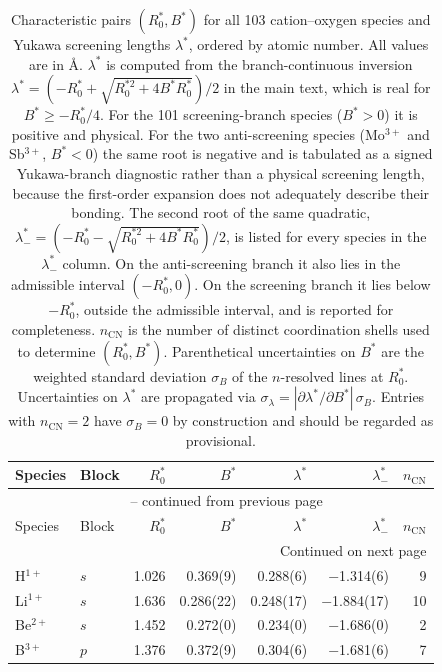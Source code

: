 \begin{longtable}{l l r r r r r}
\caption{Characteristic pairs $(R_0^*,B^*)$ for all 103 cation--oxygen
species and Yukawa screening lengths $\lambda^*$, ordered by atomic
number.  All values are in \AA.  $\lambda^*$ is computed from the
branch-continuous inversion
$\lambda^*=(-R_0^*+\sqrt{R_0^{*2}+4B^*R_0^*})/2$ in the main text,
which is real for $B^*\ge -R_0^*/4$.  For the 101 screening-branch
species ($B^*>0$) it is positive and physical.  For the two
anti-screening species (Mo$^{3+}$ and Sb$^{3+}$, $B^*<0$) the same
root is negative and is tabulated as a signed Yukawa-branch
diagnostic rather than a physical screening length, because the
first-order expansion does not adequately describe their bonding.
The second root of the same quadratic,
$\lambda^*_-=(-R_0^*-\sqrt{R_0^{*2}+4B^*R_0^*})/2$, is listed for
every species in the $\lambda^*_-$ column.  On the anti-screening
branch it also lies in the admissible interval $(-R_0^*,0)$.  On
the screening branch it lies below $-R_0^*$, outside the
admissible interval, and is reported for completeness.
$n_{\mathrm{CN}}$ is the number of distinct coordination shells used
to determine $(R_0^*,B^*)$.
Parenthetical uncertainties on $B^*$ are the weighted standard deviation
$\sigma_B$ of the $n$-resolved lines at $R_0^*$.  Uncertainties on
$\lambda^*$ are propagated via
$\sigma_\lambda=|\partial\lambda^*/\partial B^*|\,\sigma_B$.
Entries with $n_{\mathrm{CN}}=2$ have $\sigma_B=0$ by construction
and should be regarded as provisional.}
\label{tab:lambda_star} \\
\hline\hline
  Species & Block & $R_0^*$ & $B^*$ & $\lambda^*$ & $\lambda^*_-$ & $n_{\mathrm{CN}}$ \\
\hline
\endfirsthead
\multicolumn{7}{c}{\tablename\ \thetable{} -- continued from previous page} \\
\hline
  Species & Block & $R_0^*$ & $B^*$ & $\lambda^*$ & $\lambda^*_-$ & $n_{\mathrm{CN}}$ \\
\hline
\endhead
\hline
\multicolumn{7}{r}{Continued on next page} \\
\endfoot
\hline\hline
\endlastfoot
  H$^{1+}$             & $s$   & 1.026 &       0.369(9) &       0.288(6) &    $-$1.314(6) & 9 \\
  Li$^{1+}$            & $s$   & 1.636 &      0.286(22) &      0.248(17) &   $-$1.884(17) & 10 \\
  Be$^{2+}$            & $s$   & 1.452 &       0.272(0) &       0.234(0) &    $-$1.686(0) & 2 \\
  B$^{3+}$             & $p$   & 1.376 &       0.372(9) &       0.304(6) &    $-$1.681(6) & 7 \\

\end{longtable}
